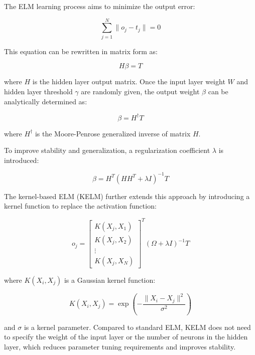\documentclass[11pt,a4paper]{article}
\begin{document}
The ELM learning process aims to minimize the output error:

\begin{equation}
\sum_{j=1}^{N} \|o_j - t_j\| = 0
\end{equation}

This equation can be rewritten in matrix form as:

\begin{equation}
H\beta = T
\end{equation}

where $H$ is the hidden layer output matrix. Once the input layer weight $W$ and hidden layer threshold $\gamma$ are randomly given, the output weight $\beta$ can be analytically determined as:

\begin{equation}
\beta = H^{\dagger}T
\end{equation}

where $H^{\dagger}$ is the Moore-Penrose generalized inverse of matrix $H$.

To improve stability and generalization, a regularization coefficient $\lambda$ is introduced:

\begin{equation}
\beta = H^T(HH^T + \lambda I)^{-1}T
\end{equation}

The kernel-based ELM (KELM) further extends this approach by introducing a kernel function to replace the activation function:

\begin{equation}
o_j = \begin{bmatrix} K(X_j, X_1) \\ K(X_j, X_2) \\ \vdots \\ K(X_j, X_N) \end{bmatrix}^T (\Omega + \lambda I)^{-1}T
\end{equation}

where $K(X_i, X_j)$ is a Gaussian kernel function:

\begin{equation}
K(X_i, X_j) = \exp\left(-\frac{\|X_i - X_j\|^2}{\sigma^2}\right)
\end{equation}

and $\sigma$ is a kernel parameter. Compared to standard ELM, KELM does not need to specify the weight of the input layer or the number of neurons in the hidden layer, which reduces parameter tuning requirements and improves stability.
\end{document}
